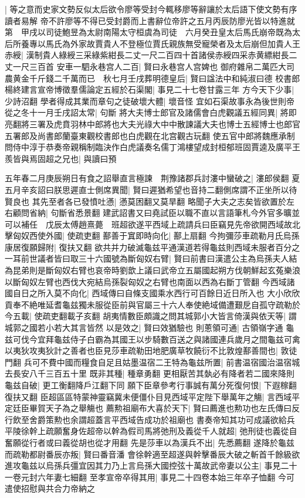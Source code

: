 |{
	等之意而史家文勢反似太后欲令廖等受封今輒移廖等辭讓於太后語下使文勢有序讀者易解}
帝不許廖等不得已受封爵而上書辭位帝許之五月丙辰防廖光皆以特進就第　甲戌以司徒鮑昱為太尉南陽太守桓虞為司徒　六月癸丑皇太后馬氏崩帝既為太后所養專以馬氏為外家故賈貴人不登極位賈氏親族無受寵榮者及太后崩但加貴人王赤綬|{
	漢制貴人綠綬三采綠紫紺長二丈一尺二百四十首諸侯赤綬四采赤黄縹紺長二丈一尺三百首}
安車一駟永巷宫人二百|{
	賢曰永巷宫人宫婢也}
御府雜帛二萬匹大司農黄金千斤錢二千萬而已　秋七月壬戌葬明德皇后|{
	賢曰諡法中和純淑曰德}
校書郎楊終建言宣帝博徵羣儒論定五經於石渠閣|{
	事見二十七卷甘露三年}
方今天下少事|{
	少詩沼翻}
學者得成其業而章句之徒破壞大體|{
	壞音怪}
宜如石渠故事永為後世則帝從之冬十一月壬戌詔太常|{
	句斷}
將大夫博士郎官及諸儒會白虎觀議五經同異|{
	將即亮翻將三署及虎賁羽林中郎將也大夫光祿大中中散諫議大夫也博士五經博士也郎官五署郎及尚書郎蘭臺東觀校書郎也白虎觀在北宫觀古玩翻}
使五官中郎將魏應承制問侍中淳于恭奏帝親稱制臨決作白虎議奏名儒丁鴻樓望成封桓郁班固賈逵及廣平王羨皆與焉固超之兄也|{
	與讀曰預}


五年春二月庚辰朔日有食之詔舉直言極諫　荆豫諸郡兵討漊中蠻破之|{
	漊郎侯翻}
夏五月辛亥詔曰朕思遲直士側席異聞|{
	賢曰遲猶希望也音持二翻側席謂不正坐所以待賢良也}
其先至者各已發憤吐懣|{
	懣莫困翻又莫旱翻}
略聞子大夫之志矣皆欲置於左右顧問省納|{
	句斷省悉景翻}
建武詔書又曰堯試臣以職不直以言語筆札今外官多曠並可以補任　戊辰太傅趙熹薨　班超欲遂平西域上疏請兵曰臣竊見先帝欲開西域故北擊匈奴西使外國|{
	使疏吏翻}
鄯善于窴即時向化|{
	鄯上扇翻}
今拘彌莎車疏勒月氏烏孫康居復願歸附|{
	復扶又翻}
欲共并力破滅龜兹平通漢道若得龜兹則西域未服者百分之一耳前世議者皆曰取三十六國號為斷匈奴右臂|{
	賢曰前書曰漢遣公主為烏孫夫人結為昆弟則是斷匈奴右臂也哀帝時劉歆上議曰武帝立五屬國起朔方伐朝鮮起玄菟樂浪以斷匈奴左臂也西伐大宛結烏孫裂匈奴之右臂也南面以西為右斷丁管翻}
今西域諸國自日之所入莫不向化|{
	西域傳曰自條支國乘水西行可百餘日近日所入也}
大小欣欣貢奉不絶唯延耆龜兹獨未服從臣前與官屬三十六人奉使絶域備遭艱戹自孤守疏勒於今五載|{
	使疏吏翻載子亥翻}
胡夷情數臣頗識之問其城郭小大皆言倚漢與依天等|{
	謂城郭之國若小若大其言皆然}
以是效之|{
	賢曰效猶驗也}
則蔥領可通|{
	古領嶺字通}
龜兹可伐今宜拜龜兹侍子白霸為其國王以步騎數百送之與諸國連兵歲月之間龜兹可禽以夷狄攻夷狄計之善者也臣見莎車疏勒田地肥廣草牧饒衍不比敦煌鄯善間也|{
	敦徒門翻}
兵可不費中國而糧食自足且姑墨温宿二王特為龜兹所置|{
	前書温宿國治温宿城去長安八千三百五十里}
既非其種|{
	種章勇翻}
更相厭苦其埶必有降者若二國來降則龜兹自破|{
	更工衡翻降戶江翻下同}
願下臣章參考行事誠有萬分死復何恨|{
	下遐稼翻復扶又翻}
臣超區區特蒙神靈竊冀未便僵仆目見西域平定陛下舉萬年之觴|{
	言西域平定廷臣畢賀天子為之舉觴也}
薦勲祖廟布大喜於天下|{
	賢曰薦進也勲功也左氏傳曰反行飲至舍爵策勲也余謂超蓋言平西域告成功於祖廟也}
書奏帝知其功可成議欲給兵平陵徐幹上疏願奮身佐超帝以幹為假司馬將弛刑及義從千人就超|{
	弛刑徒也義從自奮願從行者或曰義從胡也從才用翻}
先是莎車以為漢兵不出|{
	先悉薦翻}
遂降於龜兹而疏勒都尉番辰亦叛|{
	賢曰番音潘}
會徐幹適至超遂與幹擊番辰大破之斬首千餘級欲進攻龜兹以烏孫兵彊宜因其力乃上言烏孫大國控弦十萬故武帝妻以公主|{
	事見二十一卷元封六年妻七細翻}
至孝宣帝卒得其用|{
	事見二十四卷本始三年卒子恤翻}
今可遣使招慰與共合力帝納之

